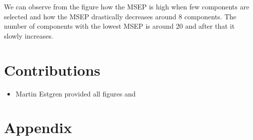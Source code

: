 \documentclass[a4paper, twocolumn]{article}
\begin{document}
	We can observe from the figure how the MSEP is high when few components are selected and how the MSEP drastically decreases around 8 components. The number of components with the lowest MSEP is around 20 and after that it slowly increases.
	
    \section*{Contributions}
    \begin{itemize}
    	\item Martin Estgren provided all figures and 
    \end{itemize}
    \nocite{*} %
    
    
    \onecolumn \appendix
    \section*{Appendix}

    
    
\end{document}
